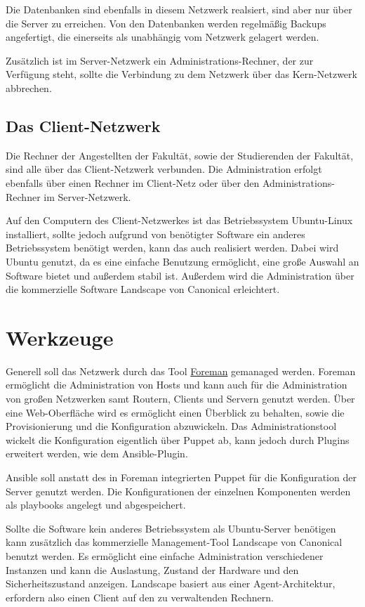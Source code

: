Die Datenbanken sind ebenfalls in diesem Netzwerk realsiert, sind aber nur über die Server zu erreichen. Von den Datenbanken werden regelmäßig Backups angefertigt, die einerseits als unabhängig vom Netzwerk gelagert werden.

Zusätzlich ist im Server-Netzwerk ein Administrations-Rechner, der zur Verfügung steht, sollte die Verbindung zu dem Netzwerk über das Kern-Netzwerk abbrechen.

\subsection{Das Client-Netzwerk}
Die Rechner der Angestellten der Fakultät, sowie der Studierenden der Fakultät, sind alle über das Client-Netzwerk verbunden. Die Administration erfolgt ebenfalls über einen Rechner im Client-Netz oder über den Administrations-Rechner im Server-Netzwerk.

Auf den Computern des Client-Netzwerkes ist das Betriebssystem Ubuntu-Linux installiert, sollte jedoch aufgrund von benötigter Software ein anderes Betriebssystem benötigt werden, kann das auch realisiert werden. Dabei wird Ubuntu genutzt, da es eine einfache Benutzung ermöglicht, eine große Auswahl an Software bietet und außerdem stabil ist. Außerdem wird die Administration über die kommerzielle Software Landscape von Canonical erleichtert.

\section{Werkzeuge}
Generell soll das Netzwerk durch das Tool \href{www.theforeman.org}{Foreman} gemanaged werden. Foreman ermöglicht die Administration von Hosts und kann auch für die Administration von großen Netzwerken samt Routern, Clients und Servern genutzt werden. Über eine Web-Oberfläche wird es ermöglicht einen Überblick zu behalten, sowie die Provisionierung und die Konfiguration abzuwickeln.
Das Administrationstool wickelt die Konfiguration eigentlich über Puppet ab, kann jedoch durch Plugins erweitert werden, wie dem Ansible-Plugin. 

Ansible soll anstatt des in Foreman integrierten Puppet für die Konfiguration der Server genutzt werden. Die Konfigurationen der einzelnen Komponenten werden als playbooks angelegt und abgespeichert.

Sollte die Software kein anderes Betriebssystem als Ubuntu-Server benötigen kann zusätzlich das kommerzielle Management-Tool Landscape von Canonical benutzt werden. Es ermöglicht eine einfache Administration verschiedener Instanzen und kann die Auslastung, Zustand der Hardware und den Sicherheitszustand anzeigen. Landscape basiert aus einer Agent-Architektur, erfordern also einen Client auf den zu verwaltenden Rechnern.

